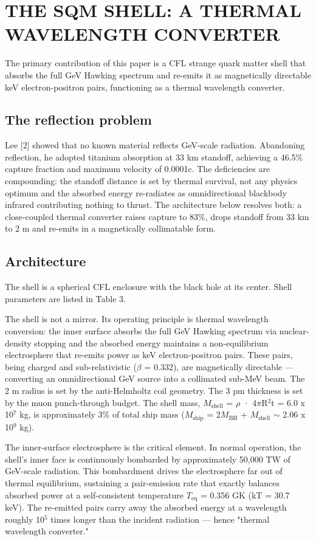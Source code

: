 \documentclass[12pt,a4paper]{article}
\begin{document}
\section{THE SQM SHELL: A THERMAL WAVELENGTH CONVERTER}
The primary contribution of this paper is a CFL strange quark matter shell that absorbs the full GeV Hawking spectrum and re-emits it as magnetically directable keV electron-positron pairs, functioning as a thermal wavelength converter.

\subsection{The reflection problem}
Lee [2] showed that no known material reflects GeV-scale radiation. Abandoning reflection, he adopted titanium absorption at 33 km standoff, achieving a 46.5\% capture fraction and maximum velocity of 0.0001c. The deficiencies are compounding: the standoff distance is set by thermal survival, not any physics optimum and the absorbed energy re-radiates as omnidirectional blackbody infrared contributing nothing to thrust. The architecture below resolves both: a close-coupled thermal converter raises capture to 83\%, drops standoff from 33 km to 2 m and re-emits in a magnetically collimatable form.

\subsection{Architecture}
The shell is a spherical CFL enclosure with the black hole at its center. Shell parameters are listed in Table 3.

The shell is not a mirror. Its operating principle is thermal wavelength conversion: the inner surface absorbs the full GeV Hawking spectrum via nuclear-density stopping and the absorbed energy maintains a non-equilibrium electrosphere that re-emits power as keV electron-positron pairs. These pairs, being charged and sub-relativistic ($\beta$ = 0.332), are magnetically directable --- converting an omnidirectional GeV source into a collimated sub-MeV beam. The 2 m radius is set by the anti-Helmholtz coil geometry. The 3 pm thickness is set by the muon punch-through budget. The shell mass, $M_{\text{shell}}$ = $\rho$ · 4$\pi$R$^{2}$t = 6.0 x 10$^{7}$ kg, is approximately 3\% of total ship mass ($M_{\text{ship}}$ = 2$M_{\text{BH}}$ + $M_{\text{shell}}$ $\sim$ 2.06 x 10$^{9}$ kg).

The inner-surface electrosphere is the critical element. In normal operation, the shell's inner face is continuously bombarded by approximately 50,000 TW of GeV-scale radiation. This bombardment drives the electrosphere far out of thermal equilibrium, sustaining a pair-emission rate that exactly balances absorbed power at a self-consistent temperature $T_{\text{eq}}$ = 0.356 GK (kT = 30.7 keV). The re-emitted pairs carry away the absorbed energy at a wavelength roughly 10$^{5}$ times longer than the incident radiation --- hence "thermal wavelength converter."
\end{document}
